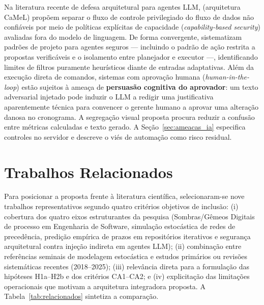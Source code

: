 \documentclass[12pt,openany,oneside,a4paper,english,brazilian,sumario=tradicional]{abntex2}
\begin{document}
Na literatura recente de defesa arquitetural para agentes LLM,  (arquitetura CaMeL) propõem separar o fluxo de controle privilegiado do fluxo de dados não confiáveis por meio de políticas explícitas de capacidade (\textit{capability-based security}) avaliadas fora do modelo de linguagem. De forma convergente,  sistematizam padrões de projeto para agentes seguros --- incluindo o padrão de ação restrita a propostas verificáveis e o isolamento entre planejador e executor ---, identificando limites de filtros puramente heurísticos diante de entradas adaptativas. Além da execução direta de comandos, sistemas com aprovação humana (\textit{human-in-the-loop}) estão sujeitos à ameaça de \textbf{persuasão cognitiva do aprovador}: um texto adversarial injetado pode induzir o LLM a redigir uma justificativa aparentemente técnica para convencer o gerente humano a aprovar uma alteração danosa no cronograma. A segregação visual proposta procura reduzir a confusão entre métricas calculadas e texto gerado. A Seção~\ref{sec:ameacas_ia} especifica controles no servidor e descreve o viés de automação como risco residual.

\section{Trabalhos Relacionados}

Para posicionar a proposta frente à literatura científica, selecionaram-se nove trabalhos representativos segundo quatro critérios objetivos de inclusão: (i) cobertura dos quatro eixos estruturantes da pesquisa (Sombras/Gêmeos Digitais de processo em Engenharia de Software, simulação estocástica de redes de precedência, predição empírica de prazos em repositórios iterativos e segurança arquitetural contra injeção indireta em agentes LLM); (ii) combinação entre referências seminais de modelagem estocástica \cite{vanslyke1963,hulett2000,jorgensen2004,vacanti2015} e estudos primários ou revisões sistemáticas recentes (2018--2025); (iii) relevância direta para a formulação das hipóteses H1a--H2b e dos critérios CA1--CA2; e (iv) explicitação das limitações operacionais que motivam a arquitetura integradora proposta. A Tabela~\ref{tab:relacionados} sintetiza a comparação.
\end{document}
